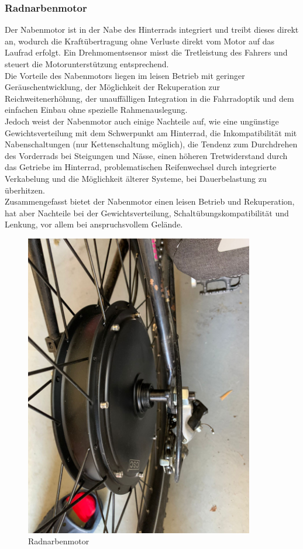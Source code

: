 \subsubsection*{Radnarbenmotor}
Der Nabenmotor ist in der Nabe des Hinterrads integriert und treibt dieses direkt an, wodurch die Kraftübertragung ohne Verluste direkt vom Motor auf das Laufrad erfolgt.
Ein Drehmomentsensor misst die Tretleistung des Fahrers und steuert die Motorunterstützung entsprechend.\\

Die Vorteile des Nabenmotors liegen im leisen Betrieb mit geringer Geräuschentwicklung, der Möglichkeit der Rekuperation zur Reichweitenerhöhung, der unauffälligen Integration in die Fahrradoptik und dem einfachen Einbau ohne spezielle Rahmenauslegung.\\

Jedoch weist der Nabenmotor auch einige Nachteile auf, wie eine ungünstige Gewichtsverteilung mit dem Schwerpunkt am Hinterrad, die Inkompatibilität mit Nabenschaltungen (nur Kettenschaltung möglich), die Tendenz zum Durchdrehen des Vorderrads bei Steigungen und Nässe, einen höheren Tretwiderstand durch das Getriebe im Hinterrad, problematischen Reifenwechsel durch integrierte Verkabelung und die Möglichkeit älterer Systeme, bei Dauerbelastung zu überhitzen.\\

Zusammengefasst bietet der Nabenmotor einen leisen Betrieb und Rekuperation, hat aber Nachteile bei der Gewichtsverteilung, Schaltübungskompatibilität und Lenkung, vor allem bei anspruchsvollem Gelände.\\

\begin{figure}[h]
    \centering
    \includegraphics[width=10cm]{images/Radnabenmotor.jpg}
    \caption{Radnarbenmotor\cite{lorenz_scherrer_selbst_2023}}%
    \label{fig:9}
\end{figure}



